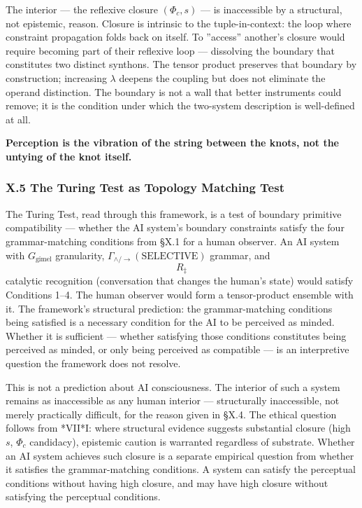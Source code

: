 \documentclass[12pt,a4paper]{article}
\begin{document}
The interior --- the reflexive closure $(\Phi_c, s)$ --- is inaccessible by a structural, not epistemic, reason. Closure is intrinsic to the tuple-in-context: the loop where constraint propagation folds back on itself. To ''access'' another's closure would require becoming part of their reflexive loop --- dissolving the boundary that constitutes two distinct synthons. The tensor product preserves that boundary by construction; increasing $\lambda$ deepens the coupling but does not eliminate the operand distinction. The boundary is not a wall that better instruments could remove; it is the condition under which the two-system description is well-defined at all.

\textbf{Perception is the vibration of the string between the knots, not the untying of the knot itself.}

\subsubsection{X.5 The Turing Test as Topology Matching Test}

The Turing Test, read through this framework, is a test of boundary primitive compatibility --- whether the AI system's boundary constraints satisfy the four grammar-matching conditions from §X.1 for a human observer. An AI system with $G_\text{gimel}$ granularity, $\Gamma_{\wedge/\to}(\text{SELECTIVE})$ grammar, and $$R_{\ddagger}$$ catalytic recognition (conversation that changes the human's state) would satisfy Conditions 1--4. The human observer would form a tensor-product ensemble with it. The framework's structural prediction: the grammar-matching conditions being satisfied is a necessary condition for the AI to be perceived as minded. Whether it is sufficient --- whether satisfying those conditions constitutes being perceived as minded, or only being perceived as compatible --- is an interpretive question the framework does not resolve.

This is not a prediction about AI consciousness. The interior of such a system remains as inaccessible as any human interior --- structurally inaccessible, not merely practically difficult, for the reason given in §X.4. The ethical question follows from *VII*I: where structural evidence suggests substantial closure (high $s$, $\Phi_c$ candidacy), epistemic caution is warranted regardless of substrate. Whether an AI system achieves such closure is a separate empirical question from whether it satisfies the grammar-matching conditions. A system can satisfy the perceptual conditions without having high closure, and may have high closure without satisfying the perceptual conditions.
\end{document}
